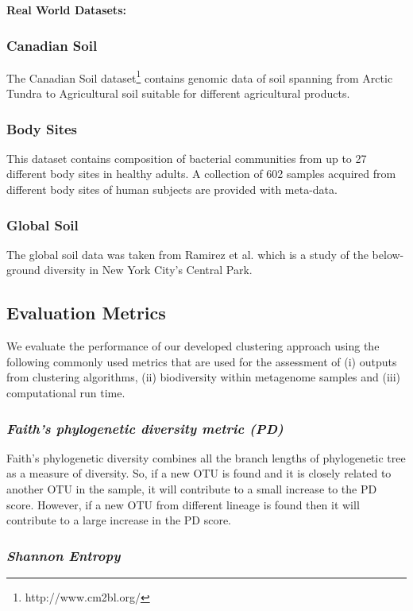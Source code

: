 \documentclass[10pt, conference, compsocconf]{IEEEtran}
\begin{document}
\textbf{Real World Datasets:}

\subsubsection{Canadian Soil}
The Canadian Soil dataset\footnote{http://www.cm2bl.org/} contains 
genomic data of soil spanning from Arctic 
Tundra to Agricultural soil suitable for different 
agricultural products.  %

\subsubsection{Body Sites}
This dataset contains composition of 
bacterial communities from up to 27 different 
body sites in healthy adults. A collection of 602 samples acquired from different body sites of human subjects are provided with meta-data.

\subsubsection{Global Soil}
The global soil data was taken from Ramirez et al. \cite{MARglobalSoil} which is a study of the below-ground diversity in New York City's Central Park. 


\subsection{\textbf{Evaluation Metrics}}

We evaluate the performance of our developed clustering approach using 
the following commonly used metrics that are used 
for the assessment of (i) outputs from clustering algorithms, (ii) biodiversity
within metagenome samples and (iii) computational run time. 


\subsubsection{\textit{Faith’s phylogenetic diversity metric (PD)}}
Faith’s phylogenetic diversity \cite{MARfaith1992conservation} combines all 
the branch lengths of phylogenetic tree as a measure of diversity. So, if a new 
OTU is found and it is closely related to another OTU in the sample, it will contribute to 
a small increase to the PD score. However, if a new OTU from different lineage is found then it will contribute to a large increase in the PD score.

\subsubsection{\textit{Shannon Entropy}}
\end{document}
